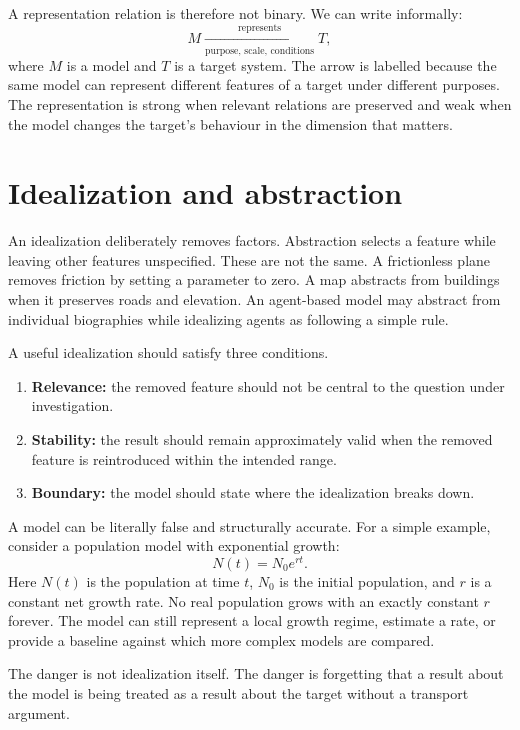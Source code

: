 A representation relation is therefore not binary. We can write informally:
\[
  M \xrightarrow[\text{purpose, scale, conditions}]{\text{represents}}
  T,
\]
where \(M\) is a model and \(T\) is a target system. The arrow is labelled
because the same model can represent different features of a target under
different purposes. The representation is strong when relevant relations are
preserved and weak when the model changes the target's behaviour in the
dimension that matters.

\section{Idealization and abstraction}

An idealization deliberately removes factors. Abstraction selects a feature
while leaving other features unspecified. These are not the same. A
frictionless plane removes friction by setting a parameter to zero. A map
abstracts from buildings when it preserves roads and elevation. An agent-based
model may abstract from individual biographies while idealizing agents as
following a simple rule.

A useful idealization should satisfy three conditions.

\begin{enumerate}
\item \textbf{Relevance:} the removed feature should not be central to the
question under investigation.
\item \textbf{Stability:} the result should remain approximately valid when the
removed feature is reintroduced within the intended range.
\item \textbf{Boundary:} the model should state where the idealization breaks
down.
\end{enumerate}

A model can be literally false and structurally accurate. For a simple example,
consider a population model with exponential growth:
\[
  N(t) = N_0 e^{rt}.
\]
Here \(N(t)\) is the population at time \(t\), \(N_0\) is the initial
population, and \(r\) is a constant net growth rate. No real population grows
with an exactly constant \(r\) forever. The model can still represent a local
growth regime, estimate a rate, or provide a baseline against which more
complex models are compared.

The danger is not idealization itself. The danger is forgetting that a result
about the model is being treated as a result about the target without a
transport argument.

